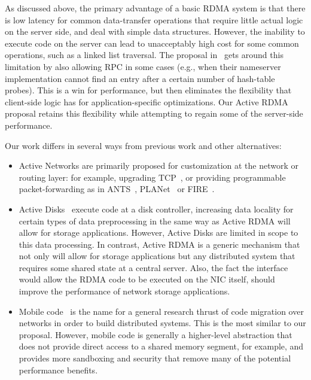 \documentclass[10pt]{article}
\begin{document}
As discussed above, the primary advantage of a basic RDMA system is
that there is low latency for common data-transfer operations that
require little actual logic on the server side, and deal with simple
data structures. However, the inability to execute code on the server
can lead to unacceptably high cost for some common operations, such as
a linked list traversal. The proposal in~\cite{thekkath94} gets around
this limitation by also allowing RPC in some cases (e.g., when their
nameserver implementation cannot find an entry after a certain number
of hash-table probes). This is a win for performance, but then
eliminates the flexibility that client-side logic has for
application-specific optimizations. Our Active RDMA proposal retains
this flexibility while attempting to regain some of the server-side
performance.

Our work differs in several ways from previous work and other
alternatives:

\begin{itemize} \itemsep -2pt

\item Active Networks are primarily proposed for customization at the
  network or routing layer: for example, upgrading TCP~\cite{AN-tcp},
  or providing programmable packet-forwarding as in ANTS~\cite{ANTS},
  PLANet~\cite{planet} or FIRE~\cite{FIRE}.

\item Active Disks~\cite{AD2,AD} execute code at a disk controller,
  increasing data locality for certain types of data preprocessing in
  the same way as Active RDMA will allow for storage applications.
  However, Active Disks are limited in scope to this data processing.
  In contrast, Active RDMA is a generic mechanism that not only will
  allow for storage applications but any distributed system that
  requires some shared state at a central server. Also, the fact the
  interface would allow the RDMA code to be executed on the NIC itself, 
  should improve the performance of network storage applications.

\item Mobile code~\cite{mobile} is the name for a general research
  thrust of code migration over networks in order to build distributed
  systems. This is the most similar to our proposal. However, mobile
  code is generally a higher-level abstraction that does not provide
  direct access to a shared memory segment, for example, and provides
  more sandboxing and security that remove many of the potential
  performance benefits.

\end{itemize}
\end{document}
